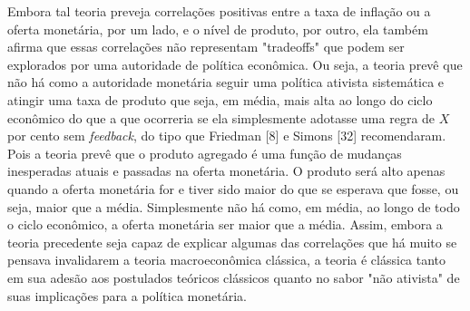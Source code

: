 \documentclass[12pt]{article}
\begin{document}
Embora tal teoria preveja correlações positivas entre a taxa de inflação ou a oferta monetária, por um lado, e o nível de produto, por outro, ela também afirma que essas correlações não representam "tradeoffs" que podem ser explorados por uma autoridade de política econômica. Ou seja, a teoria prevê que não há como a autoridade monetária seguir uma política ativista sistemática e atingir uma taxa de produto que seja, em média, mais alta ao longo do ciclo econômico do que a que ocorreria se ela simplesmente adotasse uma regra de $X$ por cento sem \textit{feedback}, do tipo que Friedman [8] e Simons [32] recomendaram. Pois a teoria prevê que o produto agregado é uma função de mudanças inesperadas atuais e passadas na oferta monetária. O produto será alto apenas quando a oferta monetária for e tiver sido maior do que se esperava que fosse, ou seja, maior que a média. Simplesmente não há como, em média, ao longo de todo o ciclo econômico, a oferta monetária ser maior que a média. Assim, embora a teoria precedente seja capaz de explicar algumas das correlações que há muito se pensava invalidarem a teoria macroeconômica clássica, a teoria é clássica tanto em sua adesão aos postulados teóricos clássicos quanto no sabor "não ativista" de suas implicações para a política monetária.
\end{document}
